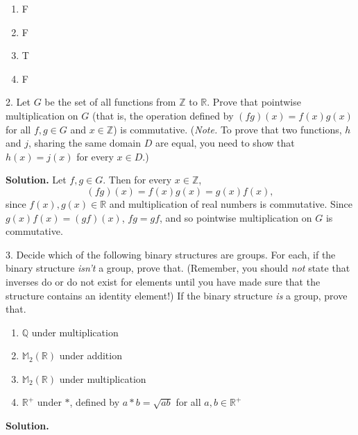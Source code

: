 \documentclass[10pt,]{book}
\theoremstyle{plain}
\theoremstyle{definition}
\theoremstyle{definition}
\theoremstyle{definition}
\theoremstyle{definition}
\numberwithin{equation}{section}
\def\Z{\mathbb{Z}}
\def\R{\mathbb{R}}
\def\Q{\mathbb{Q}}
\def\M{\mathbb{M}}
\begin{document}
\begin{exerciselist}
\begin{multicols}{4}
\begin{enumerate}[label=(\alph*)]
\item\hypertarget{li-111}{}F%
\item\hypertarget{li-112}{}F%
\item\hypertarget{li-113}{}T%
\item\hypertarget{li-114}{}F%
\end{enumerate}
\end{multicols}
%
\item[2.]\hypertarget{exercise-13}{}Let \(G\) be the set of all functions from \(\Z\) to \(\R\). Prove that pointwise multiplication on \(G\) (that is, the operation defined by \((fg)(x)=f(x)g(x)\) for all \(f,g\in G\) and \(x\in \Z\)) is commutative. (\emph{Note.} To prove that two functions, \(h\) and \(j\), sharing the same domain \(D\) are equal, you need to show that \(h(x)=j(x)\) for every \(x\in D\).)%
\par\smallskip
\par\smallskip
\noindent\textbf{Solution.}\hypertarget{solution-13}{}\quad
Let \(f,g\in G\). Then for every \(x\in \Z\),%
\begin{equation*}
(fg)(x)=f(x)g(x)=g(x)f(x),
\end{equation*}
since \(f(x), g(x)\in \R\) and multiplication of real numbers is commutative. Since \(g(x)f(x)=(gf)(x)\), \(fg=gf\), and so pointwise multiplication on \(G\) is commutative.%
\item[3.]\hypertarget{exercise-14}{}Decide which of the following binary structures are groups. For each, if the binary structure \emph{isn't} a group, prove that. (Remember, you should \emph{not} state that inverses do or do not exist for elements until you have made sure that the structure contains an identity element!) If the binary structure \emph{is} a group, prove that. \leavevmode%
\begin{enumerate}[label=(\alph*)]
\item\hypertarget{li-115}{}\(\Q\) under multiplication%
\item\hypertarget{li-116}{}\(\M_2(\R)\) under addition%
\item\hypertarget{li-117}{}\(\M_2(\R)\) under multiplication%
\item\hypertarget{li-118}{}\(\R^+\) under \(*\), defined by \(a*b=\sqrt{ab}\) for all \(a,b\in \R^+\)%
\end{enumerate}
%
\par\smallskip
\par\smallskip
\noindent\textbf{Solution.}\hypertarget{solution-14}{}\quad
\leavevmode%
\begin{enumerate}[label=(\alph*)]

\end{enumerate}
\end{exerciselist}
\end{document}
